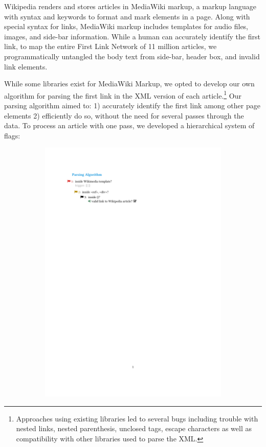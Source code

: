 \documentclass[twoside]{article}
\begin{document}
Wikipedia renders and stores articles in MediaWiki markup, a markup language with syntax and keywords to format and mark elements in a page. Along with special syntax for links, MediaWiki markup includes templates for audio files, images, and side-bar
information.
While a human can accurately identify the first link, to map the entire First Link Network of 11 million articles, we programmatically untangled the body text from side-bar, header box, and invalid link elements.

While some libraries exist for MediaWiki Markup, we opted to develop our own algorithm for parsing the first link in the XML version of each article.\footnote{
Approaches using existing libraries led to several bugs 
including trouble with nested links, nested parenthesis, unclosed tags, escape characters 
as well as compatibility with other libraries used to parse the XML.}
Our parsing algorithm aimed to: 
1) accurately identify the first link among other page elements
2) efficiently do so, without the need for several passes through the data.
To process an article with one pass, we developed a hierarchical system of flags:

\begin{figure}[H]
\centering
\caption{parsing algorithm for XML}
    \begin{subfigure}[b]{0.5\textwidth}
        \includegraphics[width=\textwidth]{graphics/flags.pdf}    
    \end{subfigure}
\end{figure}
\end{document}
